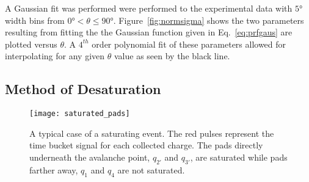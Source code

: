 \begin{comment}
\begin{table}
\centering
 \begin{tabular}{||c c c c c c||} 
 \hline
 Coefficient & $c_0$ & $c_1$ & $c_2$ & $c_3$ & $c_4$ \\ [0.5ex] 
 \hline\hline
 $0 < \theta < 45$ & & & & &  \\ [.25ex]
 \hline
 $N_0$ & .897 & 5.766E-3 & -4.263E-4 & 7.444E-6 & 5.705E-8 \\ 
 \hline
 $\sigma$ & 5.496 & -3.920E-2 & 2.693E-3 & -5.208E-5 & 5.334E-7\\
 \hline
 $45 < \theta < 90$ & & & &  & \\ [.25ex]
 \hline	
 $N_0$ & 1.220 & -6.258E-2 & 1.608E-3 & -1.492E-5  & 4.654E-8 \\
 \hline
 $\sigma$ & 31.368 & -1.109 & 1.779E-2 & -1.336E-4 & 3.940E-7\\
 \hline
\end{tabular}
\caption{Coefficients of the $4_th$ order polynomial fit to the Gaussian parameters $N_0$ and $\sigma$. The polynomial form is given as $c_0 + c_1 x + c_2 x^2 + c_3 x^3 + c_4 x^4$}
\label{tb:coeff}
\end{table}
\end{comment}
 
A Gaussian fit was performed were performed to the experimental data with  $\ang{5}$ width bins from $\ang{0} < \theta \leq \ang{90}$. Figure~\ref{fig:normsigma} shows the two parameters resulting from fitting the the Gaussian function given in Eq.~\ref{eq:prfgaus} are plotted versus $\theta$. A $4^{th}$ order polynomial fit of these parameters allowed for interpolating for any given $\theta$ value as seen by the black line. 


\subsection{Method of Desaturation}

\begin{figure}[ht!]
\texttt{[image: saturated\_pads]}
\caption{A typical case of a saturating event. The red pulses represent the time bucket signal for each collected charge. The pads directly underneath the avalanche point, $q_{2'}$ and $q_{3'}$, are saturated while pads farther away, $q_1$ and $q_4$ are not saturated.}
\label{fig:satpad}
\end{figure}


